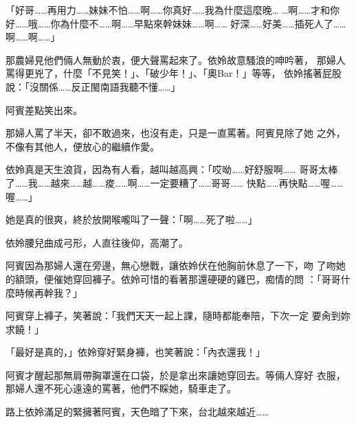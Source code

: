 「好哥……再用力……妹妹不怕……啊……你真好……我為什麼這麼晚…
…啊……才和你好……哦……你為什麼不……啊……早點來幹妹妹……啊……
好深……好美……插死人了……啊……啊……」

那農婦見他們倆人無動於衷，便大聲罵起來了。依姈故意騷浪的呻吟著，
那婦人罵得更兇了，什麼「不見笑！」、「破少年！」、「奧Bar！」等等，
依姈搖著屁股說：「沒關係……反正閩南語我聽不懂……」

阿賓差點笑出來。

那婦人罵了半天，卻不敢過來，也沒有走，只是一直罵著。阿賓見除了她
之外，不像有其他人，便放心的繼續作愛。

依姈真是天生浪貨，因為有人看，越叫越高興：「哎呦……好舒服啊……
哥哥太棒了……我……越來……越……痠……啊……一定要糟了……哥哥……
快點……再快點……喔……喔……」

她是真的很爽，終於放開喉嚨叫了一聲：「啊……死了啦……」

依姈腰兒曲成弓形，人直往後仰，高潮了。

阿賓因為那婦人還在旁邊，無心戀戰，讓依姈伏在他胸前休息了一下，吻
了吻她的額頭，便催她穿回褲子。依姈可惜的看著那還硬硬的雞巴，痴情的問
：「哥哥什麼時候再幹我？」

阿賓穿上褲子，笑著說：「我們天天一起上課，隨時都能奉陪，下次一定
要肏到妳求饒！」

「最好是真的，」依姈穿好緊身褲，也笑著說：「內衣還我！」

阿賓才醒起那無肩帶胸罩還在口袋，於是拿出來讓她穿回去。等倆人穿好
衣服，那婦人還不死心遠遠的罵著，他們不睬她，騎車走了。

路上依姈滿足的緊擁著阿賓，天色暗了下來，台北越來越近……










